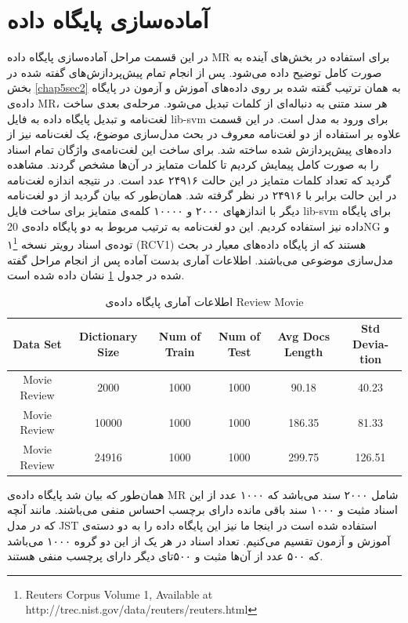 \section{آماده‌سازی پایگاه داده}
\label{chap5sec4}
در این قسمت مراحل آماده‌سازی پایگاه داده
MR
برای استفاده در بخش‌های آینده به صورت کامل توضیح داده می‌‌شود. پس از انجام تمام پیش‌پردازش‌های گفته شده در بخش
\ref{chap5sec2}
به همان ترتیب گفته شده بر روی داده‌های آموزش و آزمون در پایگاه داده‌ی
MR،
 هر سند متنی به دنباله‌ای از کلمات تبدیل می‌‌شود. مرحله‌ی بعدی ساخت لغت‌نامه و تبدیل پایگاه داد‌ه به فایل
lib-svm
برای ورود به مدل است. در این قسمت علاوه بر استفاده از دو لغت‌نامه معروف در بحث مدل‌سازی موضوع، یک لغت‌نامه نیز از داده‌های پیش‌پردازش شده ساخته شد. برای ساخت این لغت‌نامه‌ی واژگان تمام اسناد را به صورت کامل پیمایش کردیم تا کلمات متمایز در آن‌ها مشخص گردند. مشاهده‌ گردید که تعداد کلمات متمایز در این حالت ۲۴۹۱۶ عدد است. در نتیجه اندازه لغت‌نامه در این حالت برابر با ۲۴۹۱۶ در  نظر گرفته شد. همان‌طور که بیان گردید از دو لغت‌نامه دیگر با اندازههای ۲۰۰۰ و ۱۰۰۰۰ کلمه‌ی متمایز برای ساخت فایل
lib-svm
برای پایگاه داده‌ نیز استفاده کردیم. این دو لغت‌نامه به ترتیب مربوط به دو پایگاه داده‌ی 
20NG
و توده‌ی اسناد رویتر نسخه ۱\footnote{Reuters Corpus Volume 1, Available at http://trec.nist.gov/data/reuters/reuters.html}
(RCV1)
هستند که از پایگاه داده‌های معیار در بحث مدل‌سازی موضوعی می‌‌باشند. اطلاعات آماری بدست آماده پس از انجام مراحل گفته شده در جدول
\ref{chap5-tb1}
نشان داده شده است.

\begin{table}[!t]
	\centering
	\begin{latin}
		\begin{tabular}{|c|c|c|c|c|c|}
			\hline
			Data Set & Dictionary Size & Num of Train & Num of Test & Avg Docs Length & Std Deviation \\
			\hline
			Movie Review & 2000 & 1000 & 1000 & 90.18 & 40.23 \\
			\hline
			Movie Review & 10000 &1000 & 1000 & 186.35 & 81.33 \\
			\hline
			Movie Review & 24916 &1000 & 1000 & 299.75 & 126.51 \\
			\hline
		\end{tabular}
	\end{latin}
	\caption{اطلاعات آماری پایگاه داده‌ی Review Movie}
	\label{chap5-tb1}
\end{table}
همان‌طور که بیان شد پایگاه داده‌ی
MR
شامل ۲۰۰۰ سند می‌‌باشد که ۱۰۰۰ عدد از این اسناد مثبت و ۱۰۰۰ سند باقی‌ مانده دارای برچسب احساس منفی‌ می‌‌باشند. مانند آنچه که در مدل
JST \cite{lin2012weakly}
استفاده شده است در اینجا ما نیز این پایگاه داده را به دو دسته‌ی آموزش و آزمون تقسیم می‌‌کنیم. تعداد اسناد در هر یک از این دو گروه ۱۰۰۰ می‌‌باشد که ۵۰۰ عدد از آن‌ها مثبت و ۵۰۰تای دیگر دارای پرچسب منفی‌ هستند.

